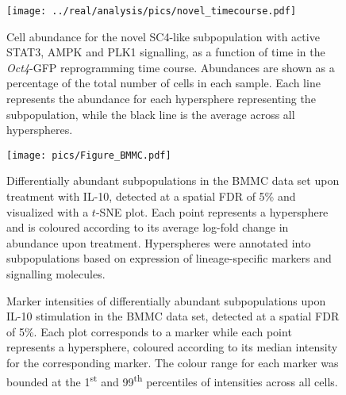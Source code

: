 \documentclass{article}
\begin{document}
\begin{figure}[p]
    \begin{center}
        \texttt{[image: ../real/analysis/pics/novel\_timecourse.pdf]}
    \end{center}
    \caption{
        Cell abundance for the novel SC4-like subpopulation with active STAT3, AMPK and PLK1 signalling, as a function of time in the \textit{Oct4}-GFP reprogramming time course.
        Abundances are shown as a percentage of the total number of cells in each sample.
        Each line represents the abundance for each hypersphere representing the subpopulation, while the black line is the average across all hyperspheres.
    }
    \label{fig:nonlinear}
\end{figure}

\begin{figure}[p]
    \begin{center}
        \texttt{[image: pics/Figure\_BMMC.pdf]}
    \end{center}
    \caption{Differentially abundant subpopulations in the BMMC data set upon treatment with IL-10, detected at a spatial FDR of 5\% and visualized with a $t$-SNE plot.
            Each point represents a hypersphere and is coloured according to its average log-fold change in abundance upon treatment.
            Hyperspheres were annotated into subpopulations based on expression of lineage-specific markers and signalling molecules.
    }
    \label{fig:bmmc}
\end{figure}

\begin{figure}[p]
    \begin{center}
    \end{center}
    \caption{
        Marker intensities of differentially abundant subpopulations upon IL-10 stimulation in the BMMC data set, detected at a spatial FDR of 5\%.
        Each plot corresponds to a marker while each point represents a hypersphere, coloured according to its median intensity for the corresponding marker.
        The colour range for each marker was bounded at the 1\textsuperscript{st} and 99\textsuperscript{th} percentiles of intensities across all cells.
    }
    \label{fig:bmmc_markers}
\end{figure}
\end{document}
